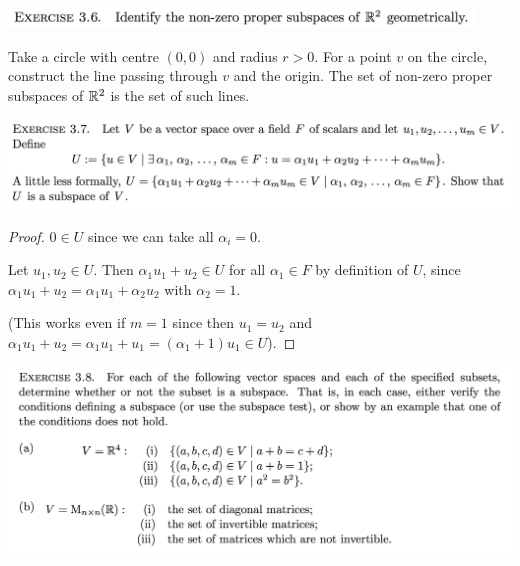 \documentclass[12pt]{article}
\begin{document}
\begin{mdframed}
\includegraphics[width=350pt]{img/oxford-prelims-M1-linear-algebra-3-6.png}
\end{mdframed}
Take a circle with centre $(0, 0)$ and radius $r > 0$. For a point $v$ on the
circle, construct the line passing through $v$ and the origin. The set of
non-zero proper subspaces of $\mathbb{R}^2$ is the set of such lines.

\begin{mdframed}
\includegraphics[width=400pt]{img/oxford-prelims-M1-linear-algebra-3-7.png}
\end{mdframed}

\begin{proof}
  $0 \in U$ since we can take all $\alpha_i = 0$.

  Let $u_1, u_2 \in U$. Then $\alpha_1u_1 + u_2 \in U$ for all $\alpha_1 \in F$
  by definition of $U$, since $\alpha_1u_1 + u_2 = \alpha_1 u_1 + \alpha_2 u_2$
  with $\alpha_2 = 1$.

  (This works even if $m = 1$ since then $u_1 = u_2$ and
  $\alpha_1u_1 + u_2 = \alpha_1 u_1 + u_1 = (\alpha_1 + 1)u_1 \in U$).
\end{proof}

\begin{mdframed}
\includegraphics[width=400pt]{img/oxford-prelims-M1-linear-algebra-3-8.png}
\end{mdframed}
\end{document}
